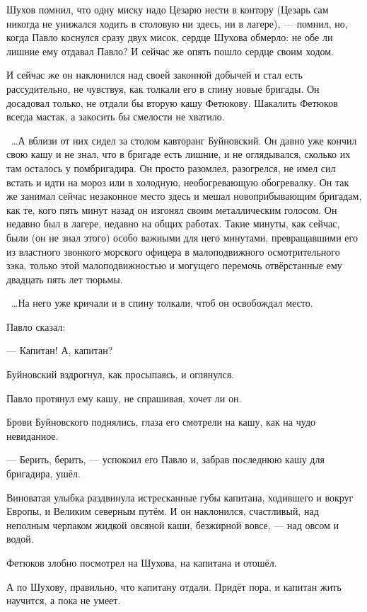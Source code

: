 Шухов помнил, что одну миску надо Цезарю нести в контору (Цезарь сам никогда не унижался ходить в столовую ни здесь, ни в лагере), --- помнил, но, когда Павло коснулся сразу двух мисок, сердце Шухова обмерло: не обе ли лишние ему отдавал Павло? И сейчас же опять пошло сердце своим ходом.

И сейчас же он наклонился над своей законной добычей и стал есть рассудительно, не чувствуя, как толкали его в спину новые бригады. Он досадовал только, не отдали бы вторую кашу Фетюкову. Шакалить Фетюков всегда мастак, а закосить бы смелости не хватило.

~\dots{}А вблизи от них сидел за столом кавторанг Буйновский. Он давно уже кончил свою кашу и не знал, что в бригаде есть лишние, и не оглядывался, сколько их там осталось у помбригадира. Он просто разомлел, разогрелся, не имел сил встать и идти на мороз или в холодную, необогревающую обогревалку. Он так же занимал сейчас незаконное место здесь и мешал новоприбывающим бригадам, как те, кого пять минут назад он изгонял своим металлическим голосом. Он недавно был в лагере, недавно на общих работах. Такие минуты, как сейчас, были (он не знал этого) особо важными для него минутами, превращавшими его из властного звонкого морского офицера в малоподвижного осмотрительного зэка, только этой малоподвижностью и могущего перемочь отвёрстанные ему двадцать пять лет тюрьмы.

~\dots{}На него уже кричали и в спину толкали, чтоб он освобождал место.

Павло сказал:

--- Капитан! А, капитан?

Буйновский вздрогнул, как просыпаясь, и оглянулся.

Павло протянул ему кашу, не спрашивая, хочет ли он.

Брови Буйновского поднялись, глаза его смотрели на кашу, как на чудо невиданное.

--- Берить, берить, --- успокоил его Павло и, забрав последнюю кашу для бригадира, ушёл.

Виноватая улыбка раздвинула истресканные губы капитана, ходившего и вокруг Европы, и Великим северным путём. И он наклонился, счастливый, над неполным черпаком жидкой овсяной каши, безжирной вовсе, --- над овсом и водой.

Фетюков злобно посмотрел на Шухова, на капитана и отошёл.

А по Шухову, правильно, что капитану отдали. Придёт пора, и капитан жить научится, а пока не умеет.

